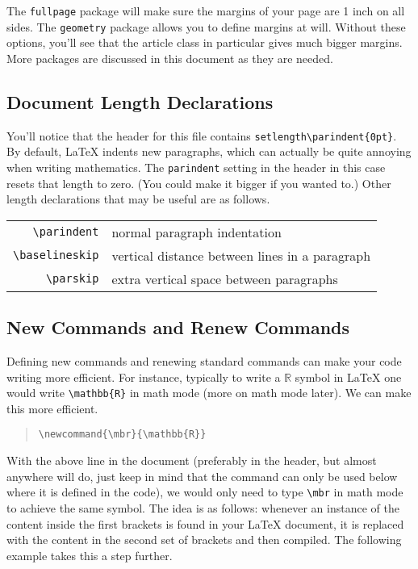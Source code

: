 \documentclass[letterpaper,twoside,10pt]{article}
\begin{document}
The \texttt{fullpage} package will make sure the margins of your page are 1 inch on all sides. The
\texttt{geometry} package allows you to define margins at will. Without these options, you'll see
that the article class in particular gives much bigger margins. More packages are discussed in this
document as they are needed.

\newpage
\subsection{Document Length Declarations}

You'll notice that the header for this file contains \verb!setlength\parindent{0pt}!. By default,
{\LaTeX} indents new paragraphs, which can actually be quite annoying when writing mathematics. The
\texttt{parindent} setting in the header in this case resets that length to zero. (You could make it
bigger if you wanted to.) Other length declarations that may be useful are as follows.

\begin{center}
\begin{tabular}{rl}
\small\verb!\parindent! & \small normal paragraph indentation\\
\small\verb!\baselineskip! & \small vertical distance between lines in a paragraph\\
\small\verb!\parskip! & \small extra vertical space between paragraphs
\end{tabular}
\end{center}

\subsection{New Commands and Renew Commands}\label{newcommand}
Defining new commands and renewing standard commands can make your code writing more efficient. For
instance, typically to write a $\mathbb{R}$ symbol in {\LaTeX} one would write \verb!\mathbb{R}! in
math mode (more on math mode later). We can make this more efficient.

\begin{quote}
 \verb!\newcommand{\mbr}{\mathbb{R}}!
\end{quote}

With the above line in the document (preferably in the header, but almost anywhere will do, just
keep in mind that the command can only be used below where it is defined in the code), we would only
need to type \verb!\mbr! in math mode to achieve the same symbol. The idea is as follows: whenever
an instance of the content inside the first brackets is found in your {\LaTeX} document, it is
replaced with the content in the second set of brackets and then compiled. The following example
takes this a step further.
\end{document}
